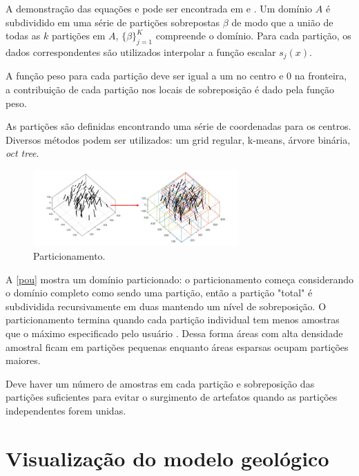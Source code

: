 A demonstração das equações e pode ser encontrada em  e . Um domínio $A$ é subdividido em uma série de partições sobrepostas $\beta$ de modo que a união de todas as $k$ partições em $A$, $\{ \beta \}^K_{j=1}$ compreende o domínio. Para cada partição, os dados correspondentes são utilizados interpolar a função escalar $s_j(x)$.

A função peso para cada partição deve ser igual a um no centro e 0 na fronteira, a contribuição de cada partição nos locais de sobreposição é dado pela função peso.

As partições são definidas encontrando uma série de coordenadas para os centros. Diversos métodos podem ser utilizados: um grid regular, k-means, árvore binária, \textit{oct tree}.

\begin{figure}[!htb]
	\caption{\label{pou}Particionamento.}
	\begin{center}
		\includegraphics[width=0.7\textwidth]{capitulo_2/pou.jpg}
	\end{center}
\end{figure}

A \autoref{pou} mostra um domínio particionado: o particionamento começa considerando o domínio completo como sendo uma partição, então a partição "total" é subdividida recursivamente em duas mantendo um nível de sobreposição. O particionamento termina quando cada partição individual tem menos amostras que o máximo especificado pelo usuário \cite{martin2017implicitmodeling}. Dessa forma áreas com alta densidade amostral ficam em partições pequenas enquanto áreas esparsas ocupam partições maiores.

Deve haver um número de amostras em cada partição e sobreposição das partições suficientes para evitar o surgimento de artefatos quando as partições independentes forem unidas.

\section{Visualização do modelo geológico}

